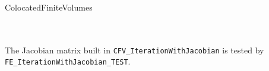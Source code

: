         {ColocatedFiniteVolumes} \\
 \\
 \\


The Jacobian matrix built in \verb+CFV_IterationWithJacobian+
is tested by \verb+FE_IterationWithJacobian_TEST+.